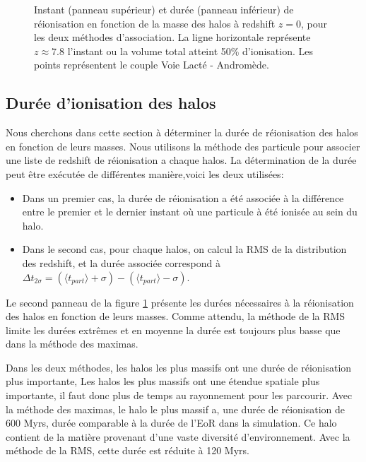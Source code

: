 \begin{figure}
        \caption[Instant et durée de réionisation]{Instant (panneau supérieur) et durée (panneau inférieur) de réionisation en fonction de la masse des halos à redshift $z=0$, pour les deux méthodes d'association. 
        La ligne horizontale représente $z\approx7.8$ l'instant ou la volume total atteint 50\% d'ionisation.
        Les points représentent le couple Voie Lacté - Andromède.
		\label{fig:CODA_t}}
\end{figure}


\subsection{Durée d'ionisation des halos}

Nous cherchons dans cette section à déterminer la durée de réionisation des halos en fonction de leurs masses.
Nous utilisons la méthode des particule pour associer une liste de redshift de réionisation a chaque halos.
La détermination de la durée peut être exécutée de différentes manière,voici les deux utilisées:
\begin{itemize}
\item Dans un premier cas, la durée de réionisation a été associée à la différence entre le premier et le dernier instant où une particule à été ionisée au sein du halo.
\item Dans le second cas, pour chaque halos, on calcul la RMS de la distribution des redshift, et la durée associée correspond à $\Delta t_{2\sigma} =  ( \langle t_{part} \rangle + \sigma) - ( \langle t_{part} \rangle - \sigma)$.
\end{itemize}

Le second panneau de la figure \ref{fig:CODA_t} présente les durées nécessaires à la réionisation des halos en fonction de leurs masses.
Comme attendu, la méthode de la RMS limite les durées extrêmes et en moyenne la durée est toujours plus basse que dans la méthode des maximas.

Dans les deux méthodes, les halos les plus massifs ont une durée de réionisation plus importante,
Les halos les plus massifs ont une étendue spatiale plus importante, il faut donc plus de temps au rayonnement pour les parcourir.
Avec la méthode des maximas, le halo le plus massif a, une durée de réionisation de 600 Myrs, durée comparable à la durée de l'\ac{EoR} dans la simulation.
Ce halo contient de la matière provenant d'une vaste diversité d’environnement. %
Avec la méthode de la RMS, cette durée est réduite à 120 Myrs.

